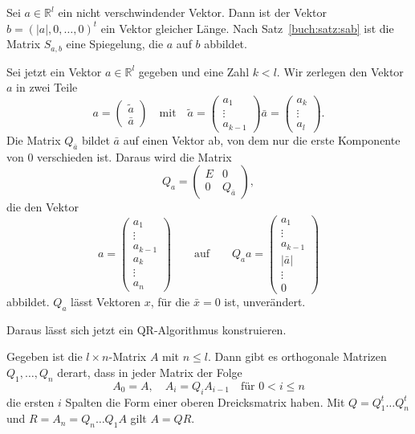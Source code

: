 Sei $a\in\mathbb R^l$ ein nicht verschwindender Vektor.
Dann ist der Vektor $b=(|a|,0,\dots,0)^t$ ein Vektor gleicher Länge.
Nach Satz~\ref{buch:satz:sab} ist die Matrix $S_{a,b}$ eine Spiegelung,
die $a$ auf $b$ abbildet.

Sei jetzt ein Vektor $a\in\mathbb R^l$ gegeben und eine Zahl $k< l$.
Wir zerlegen den Vektor $a$ in zwei Teile
\[
a = \begin{pmatrix}\tilde{a}\\\bar{a}\end{pmatrix}
\quad\text{mit}\quad
\tilde{a}=\begin{pmatrix}a_1\\\vdots\\a_{k-1}\end{pmatrix}
\bar{a}=\begin{pmatrix}a_k\\\vdots \\a_l\end{pmatrix}.
\]
Die Matrix $Q_{\bar{a}}$ bildet $\bar{a}$ auf einen Vektor ab, von dem
nur die erste Komponente von $0$ verschieden ist.
Daraus wird die Matrix
\begin{equation}
Q_a
=
\begin{pmatrix} E&0\\0&Q_{\bar{a}}\end{pmatrix},
\label{buch:eqn:Qa}
\end{equation}
die den Vektor
\[
a=\begin{pmatrix}
a_1\\\vdots\\ a_{k-1}\\a_{k}\\\vdots\\a_n
\end{pmatrix}
\qquad\text{auf}\qquad
Q_aa
=
\begin{pmatrix}a_1\\\vdots\\a_{k-1}\\ |\bar{a}|\\\vdots\\0\end{pmatrix}
\]
abbildet.
$Q_a$ lässt Vektoren $x$, für die $\bar{x}=0$ ist, unverändert.

Daraus lässt sich jetzt ein QR-Algorithmus konstruieren.

\begin{satz}
Gegeben ist die $l\times n$-Matrix $A$ mit $n\le l$.
Dann gibt es orthogonale Matrizen $Q_1,\dots,Q_n$ derart, dass in
jeder Matrix der Folge
\[
A_0 = A, \quad A_{i} = Q_{i}A_{i-1}\quad\text{für $0<i\le n$}
\]
die ersten $i$ Spalten die Form einer oberen Dreicksmatrix haben.
%
Mit $Q=Q_1^t\dots Q_n^t$ und $R=A_n=Q_n\dots Q_1A$ gilt $A=QR$.
\end{satz}

